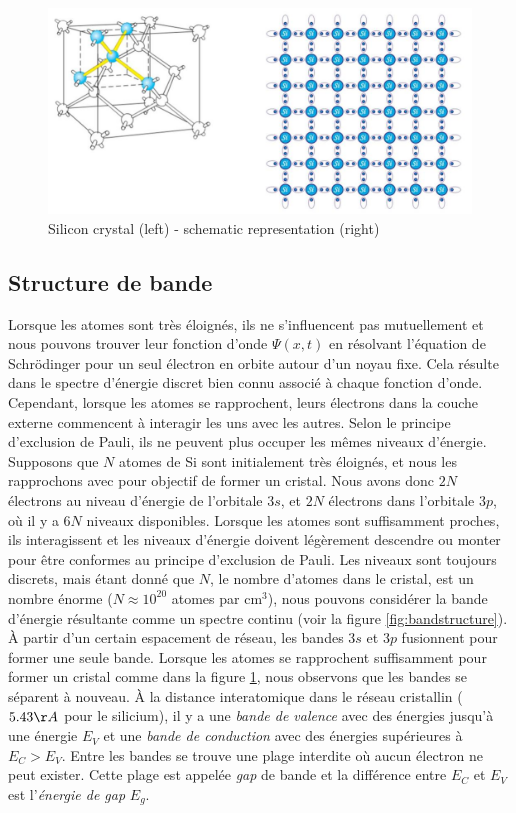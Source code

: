 \begin{figure}[htbp]
\includegraphics[width=12cm]{figures/ch01/crystal.jpg}
\caption{Silicon crystal (left) - schematic representation (right)}
\label{fig:crystal}
\end{figure} 

\subsection{Structure de bande}
Lorsque les atomes sont très éloignés, ils ne s'influencent pas mutuellement et nous pouvons trouver leur fonction d'onde $\Psi(x, t)$ en résolvant l'équation de Schrödinger pour un seul électron en orbite autour d'un noyau fixe. Cela résulte dans le spectre d'énergie discret bien connu associé à chaque fonction d'onde. Cependant, lorsque les atomes se rapprochent, leurs électrons dans la couche externe commencent à interagir les uns avec les autres. Selon le principe d'exclusion de Pauli, ils ne peuvent plus occuper les mêmes niveaux d'énergie.\\
Supposons que $N$ atomes de Si sont initialement très éloignés, et nous les rapprochons avec pour objectif de former un cristal. Nous avons donc $2N$ électrons au niveau d'énergie de l'orbitale $3s$, et $2N$ électrons dans l'orbitale $3p$, où il y a $6N$ niveaux disponibles. Lorsque les atomes sont suffisamment proches, ils interagissent et les niveaux d'énergie doivent légèrement descendre ou monter pour être conformes au principe d'exclusion de Pauli. Les niveaux sont toujours discrets, mais étant donné que $N$, le nombre d'atomes dans le cristal, est un nombre énorme ($N \approx 10^{20}$ atomes par cm$^3$), nous pouvons considérer la bande d'énergie résultante comme un spectre continu (voir la figure \ref{fig:bandstructure}). À partir d'un certain espacement de réseau, les bandes $3s$ et $3p$ fusionnent pour former une seule bande. Lorsque les atomes se rapprochent suffisamment pour former un cristal comme dans la figure \ref{fig:crystal}, nous observons que les bandes se séparent à nouveau. À la distance interatomique dans le réseau cristallin ($5.43 \AA$ pour le silicium), il y a une \emph{bande de valence} avec des énergies jusqu'à une énergie $E_V$ et une \emph{bande de conduction} avec des énergies supérieures à $E_C > E_V$. Entre les bandes se trouve une plage interdite où aucun électron ne peut exister. Cette plage est appelée \emph{gap} de bande et la différence entre $E_C$ et $E_V$ est l'\emph{énergie de gap} $E_g$.

